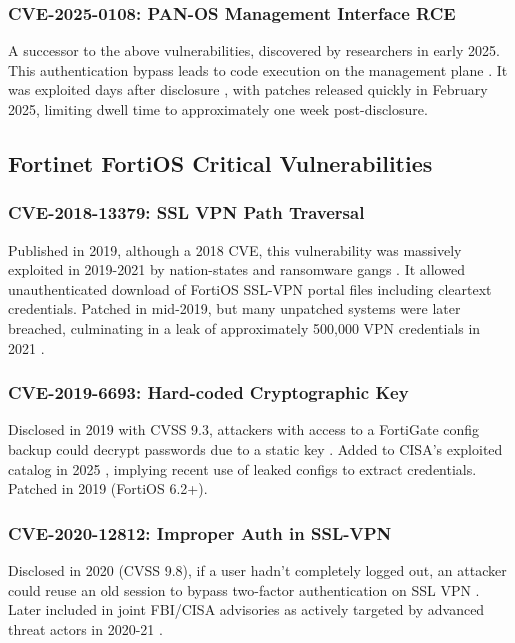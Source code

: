 \documentclass[12pt]{article}
\begin{document}
\subsubsection{CVE-2025-0108: PAN-OS Management Interface RCE}
A successor to the above vulnerabilities, discovered by researchers in early 2025. This authentication bypass leads to code execution on the management plane \cite{securityweek2024}. It was exploited days after disclosure \cite{hackersexploit2024}, with patches released quickly in February 2025, limiting dwell time to approximately one week post-disclosure.

\subsection{Fortinet FortiOS Critical Vulnerabilities}

\subsubsection{CVE-2018-13379: SSL VPN Path Traversal}
Published in 2019, although a 2018 CVE, this vulnerability was massively exploited in 2019-2021 by nation-states and ransomware gangs \cite{bleepingcomputer2022}. It allowed unauthenticated download of FortiOS SSL-VPN portal files including cleartext credentials. Patched in mid-2019, but many unpatched systems were later breached, culminating in a leak of approximately 500,000 VPN credentials in 2021 \cite{bleepingcomputer2022}.

\subsubsection{CVE-2019-6693: Hard-coded Cryptographic Key}
Disclosed in 2019 with CVSS 9.3, attackers with access to a FortiGate config backup could decrypt passwords due to a static key \cite{nvd20196693}. Added to CISA's exploited catalog in 2025 \cite{cisafortios2025}, implying recent use of leaked configs to extract credentials. Patched in 2019 (FortiOS 6.2+).

\subsubsection{CVE-2020-12812: Improper Auth in SSL-VPN}
Disclosed in 2020 (CVSS 9.8), if a user hadn't completely logged out, an attacker could reuse an old session to bypass two-factor authentication on SSL VPN \cite{cybergc2020}. Later included in joint FBI/CISA advisories as actively targeted by advanced threat actors in 2020-21 \cite{cybergc2020}.
\end{document}
